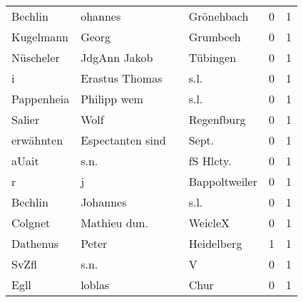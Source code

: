\documentclass[10pt,a4paper,landscape]{article}
\begin{document}
\begin{longtable}{llllrr}
                  Bechlin &                            ohannes &             &                                  Grönehbach &          0 &         1 \\
                Kugelmann &                              Georg &             &                                    Grumbeeh &          0 &         1 \\
                Nüscheler &                       JdgAnn Jakob &             &                                    Tübingen &          0 &         1 \\
                        i &                     Erastus Thomas &             &                                        s.l. &          0 &         1 \\
               Pappenheia &                        Philipp wem &             &                                        s.l. &          0 &         1 \\
                   Salier &                               Wolf &             &                                  Regenfburg &          0 &         1 \\
                erwähnten &                   Espectanten sind &             &                                      Sept.  &          0 &         1 \\
                    aUait &                               s.n. &             &                                  fS Hlcty.  &          0 &         1 \\
                        r &                                  j &             &                               Bappoltweiler &          0 &         1 \\
                  Bechlin &                           Johannes &             &                                        s.l. &          0 &         1 \\
                  Colgnet &                       Mathieu dun. &             &                                     WeicleX &          0 &         1 \\
                 Dathenus &                              Peter &             &                                  Heidelberg &          1 &         1 \\
                    SvZfl &                               s.n. &             &                                           V &          0 &         1 \\
                     Egll &                             loblas &             &                                        Chur &          0 &         1 \\

\end{longtable}
\end{document}

